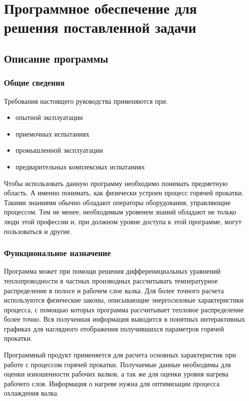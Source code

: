 \section{Программное обеспечение для решения поставленной задачи}

\subsection{Описание программы}

\subsubsection{Общие сведения}
Требования настоящего руководства применяются при:

\begin{itemize}
\item опытной эксплуатации
\item приемочных испытаниях
\item промышленной эксплуатации
\item предварительных комплексных испытаниях
\end{itemize}

Чтобы использовать данную программу необходимо понимать предметную область. А именно понимать, как физически устроен процесс горячей прокатки. Такими знаниями обычно обладают операторы оборудования, управляющие процессом. Тем не менее, необходимым уровенем знаний обладают не только люди этой профессии и, при должном уровне доступа к этой программе, могут пользоваться и другие.

\subsubsection{Функциональное назначение}
Программа может при помощи решения дифференициальных уравнений теплопроводности в частных производных рассчитывать температурное распределение в полосе и рабочем слое валка. Для более точного расчета используются физические законы, описывающие энергосиловые характеристики процесса, с помощью которых программа рассчитывает тепловое распределение более точно. Вся полученная информация выводится в понятных интерактивных графиках для наглядного отображения получившихся параметров горячей прокатки.

Программный продукт применяется для расчета основных характеристик при работе с процессом горячей прокатки. Получаемые данные необходимы для оценки изношенности рабочих валков, а так же для оценки уровня нагрева рабочего слоя. Информация о нагреве нужна для оптимизации процесса охлаждения валка.

